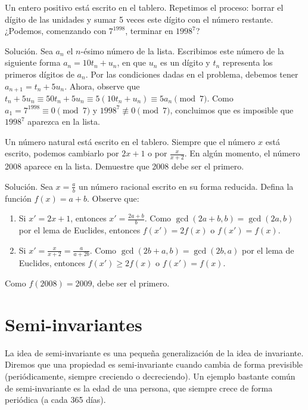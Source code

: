 \documentclass[11pt]{scrartcl}
\begin{document}
\begin{example}
Un entero positivo está escrito en el tablero. Repetimos el proceso: borrar el dígito de las unidades y sumar 5 veces este dígito con el número restante. ¿Podemos, comenzando con \(7^{1998}\), terminar en \(1998^7\)?
\end{example}
Solución. Sea \( a_n \) el \( n \)-ésimo número de la lista. Escribimos este número de la siguiente forma \( a_n = 10t_n + u_n \), en que \( u_n \) es un dígito y \( t_n \) representa los primeros dígitos de \( a_n \). Por las condiciones dadas en el problema, debemos tener \( a_{n+1} = t_n + 5u_n \). Ahora, observe que \( t_n + 5u_n \equiv 50t_n + 5u_n \equiv 5(10t_n + u_n) \equiv 5a_n \pmod{7} \). Como \( a_1 = 7^{1998} \equiv 0 \pmod{7} \) y \( 1998^7 \not\equiv 0 \pmod{7} \), concluimos que es imposible que \(1998^7\) aparezca en la lista.

\begin{example}
Un número natural está escrito en el tablero. Siempre que el número \( x \) está escrito, podemos cambiarlo por \( 2x + 1 \) o por \( \frac{x}{x + 2} \). En algún momento, el número 2008 aparece en la lista. Demuestre que 2008 debe ser el primero.
\end{example}
Solución. Sea \( x = \frac{a}{b} \) un número racional escrito en su forma reducida. Defina la función \( f(x) = a + b \). Observe que:\begin{enumerate}
\item Si \( x' = 2x + 1 \), entonces \( x' = \frac{2a + b}{b} \). Como \( \gcd(2a + b, b) = \gcd(2a, b) \) por el lema de Euclides, entonces \( f(x') = 2f(x) \) o \( f(x') = f(x) \).
\item Si \( x' = \frac{x}{x + 2} = \frac{a}{a + 2b} \). Como \( \gcd(2b + a, b) = \gcd(2b, a) \) por el lema de Euclides, entonces \( f(x') \geq 2f(x) \) o \( f(x') = f(x) \).
\end{enumerate}

Como \( f(2008) = 2009 \), debe ser el primero.\\

\section{Semi-invariantes}
La idea de semi-invariante es una pequeña generalización de la idea de invariante. Diremos que una propiedad es semi-invariante cuando cambia de forma previsible (periódicamente, siempre creciendo o decreciendo). Un ejemplo bastante común de semi-invariante es la edad de una persona, que siempre crece de forma periódica (a cada 365 días).
\end{document}
